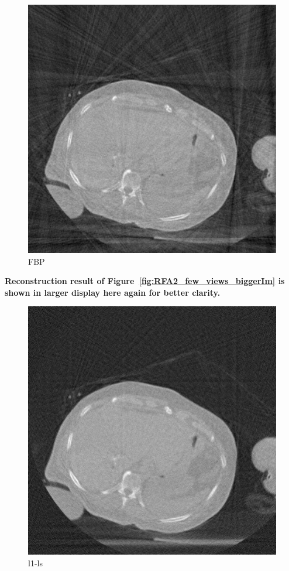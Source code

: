 \documentclass{article}
\begin{document}
\begin{figure}[!h]
\centering
\includegraphics[width=1.2\columnwidth]{../images/tmh/RFA2/few_views/fbp.png}
\captionsetup{labelformat=empty}
\caption[Representative results-2]{\large{FBP}}
\label{fig:RFA2_few_views_bigger}
\end{figure}
\newpage
\textbf{Reconstruction result of Figure~\ref{fig:RFA2_few_views_biggerIm}  is shown in larger display here  again for better clarity.}\\
\begin{figure}[!h]
\centering
\includegraphics[width=1.2\columnwidth]{../images/tmh/RFA2/few_views/cs_dct.png}
\captionsetup{labelformat=empty}
\caption[Representative results-2]{\large{l1-ls}}
\label{fig:RFA2_few_views_bigger}
\end{figure}
\end{document}
